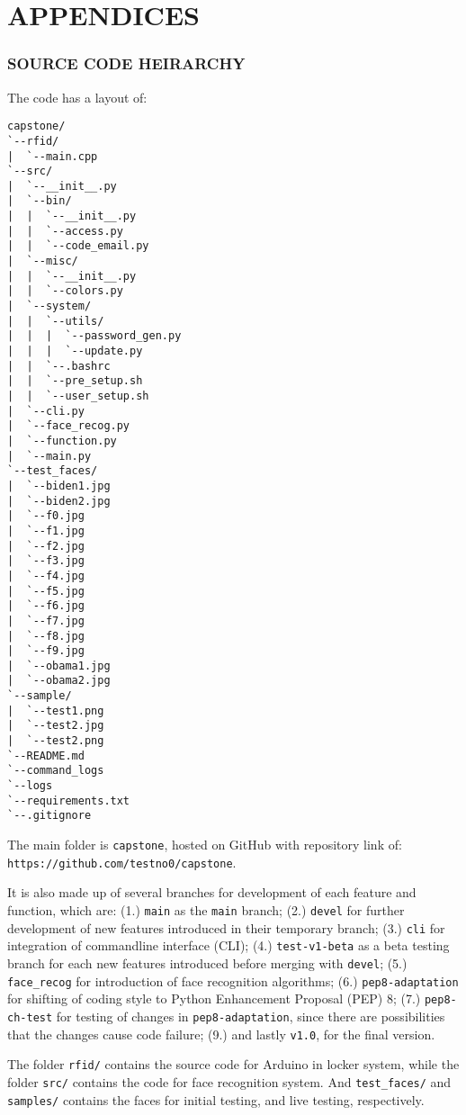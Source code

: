 \documentclass[12pt]{article}
\begin{document}
	
\section*{APPENDICES\centering}
\subsubsection*{SOURCE CODE HEIRARCHY}

The code has a layout of:

\singlespacing
\begin{lstlisting}
capstone/
`--rfid/
|  `--main.cpp
`--src/
|  `--__init__.py
|  `--bin/
|  |  `--__init__.py
|  |  `--access.py
|  |  `--code_email.py	
|  `--misc/
|  |  `--__init__.py
|  |  `--colors.py
|  `--system/
|  |  `--utils/
|  |  |  `--password_gen.py
|  |  |  `--update.py
|  |  `--.bashrc
|  |  `--pre_setup.sh
|  |  `--user_setup.sh
|  `--cli.py
|  `--face_recog.py
|  `--function.py
|  `--main.py
`--test_faces/
|  `--biden1.jpg
|  `--biden2.jpg
|  `--f0.jpg
|  `--f1.jpg
|  `--f2.jpg
|  `--f3.jpg
|  `--f4.jpg
|  `--f5.jpg
|  `--f6.jpg
|  `--f7.jpg
|  `--f8.jpg
|  `--f9.jpg
|  `--obama1.jpg
|  `--obama2.jpg
`--sample/
|  `--test1.png
|  `--test2.jpg
|  `--test2.png
`--README.md
`--command_logs
`--logs
`--requirements.txt
`--.gitignore
\end{lstlisting}
\doublespacing

The main folder is \texttt{capstone}, hosted on GitHub with repository link of: \texttt{https://github.com/testno0/capstone}.

It is also made up of several branches for development of each feature and function, which are: (1.) \texttt{main} as the \texttt{main} branch; (2.) \texttt{devel} for further development of new features introduced in their temporary branch; (3.) \texttt{cli} for integration of commandline interface (CLI); (4.) \texttt{test-v1-beta} as a beta testing branch for each new features introduced before merging with \texttt{devel}; (5.) \texttt{face\_recog} for introduction of face recognition algorithms; (6.) \texttt{pep8-adaptation} for shifting of coding style to Python Enhancement Proposal (PEP) 8; (7.) \texttt{pep8-ch-test} for testing of changes in \texttt{pep8-adaptation}, since there are possibilities that the changes cause code failure; (9.) and lastly \texttt{v1.0}, for the final version.

The folder \texttt{rfid/} contains the source code for Arduino in locker system, while the folder \texttt{src/} contains the code for face recognition system. And \texttt{test\_faces/} and \texttt{samples/} contains the faces for initial testing, and live testing, respectively.
\end{document}
